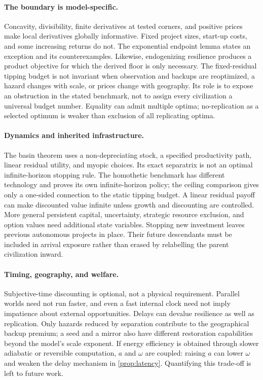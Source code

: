 \paragraph{The boundary is model-specific.}
Concavity, divisibility, finite derivatives at tested corners, and positive
prices make local derivatives globally informative. Fixed project sizes,
start-up costs, and some increasing returns do not. The exponential
endpoint lemma states an exception and its counterexamples. Likewise,
endogenizing resilience produces a product objective for which the derived
floor is only necessary. The fixed-residual tipping budget is not invariant
when observation and backups are reoptimized, a hazard changes with scale,
or prices change with geography. Its role is to expose an obstruction in
the stated benchmark, not to assign every civilization a universal budget
number. Equality can admit multiple optima; no-replication as a selected
optimum is weaker than exclusion of all replicating optima.

\paragraph{Dynamics and inherited infrastructure.}
The basin theorem uses a non-depreciating stock, a specified productivity
path, linear residual utility, and myopic choices. Its exact separatrix is
not an optimal infinite-horizon stopping rule. The homothetic benchmark
has different technology and proves its own infinite-horizon policy;
the ceiling comparison gives only a one-sided connection to the static
tipping budget. A linear residual payoff can make discounted value
infinite unless growth and discounting are controlled. More general
persistent capital, uncertainty, strategic resource exclusion, and
option values need additional state variables. Stopping new investment
leaves previous autonomous projects in place. Their future descendants
must be included in arrival exposure rather than erased by relabelling
the parent civilization inward.

\paragraph{Timing, geography, and welfare.}
Subjective-time discounting is optional, not a physical requirement.
Parallel worlds need not run faster, and even a fast internal clock need
not imply impatience about external opportunities. Delays can devalue
resilience as well as replication. Only hazards reduced by separation
contribute to the geographical backup premium; a seed and a mirror also
have different restoration capabilities beyond the model's scale exponent.
If energy efficiency is obtained through slower adiabatic or reversible
computation, $a$ and $\omega$ are coupled: raising $a$ can lower $\omega$
and weaken the delay mechanism in \cref{prop:latency}. Quantifying this
trade-off is left to future work.

